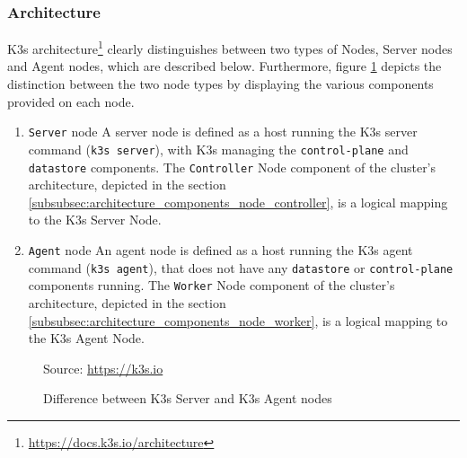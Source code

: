 \subsubsection{Architecture}
\label{subsubsec:implementation_dependencies_k3s_architecture}

K3s architecture\footnote{\url{https://docs.k3s.io/architecture}} clearly distinguishes
between two types of Nodes, Server nodes and Agent nodes, which are described below.
Furthermore, figure \ref{fig:k3s} depicts the distinction between the two node types
by displaying the various components provided on each node.
\begin{enumerate}
  \item \texttt{Server} node
    \newline
    A server node is defined as a host running the K3s server command (\lstinline[language=shell,
    basicstyle=\ttfamily, morekeywords={[2]{k3s}}, morekeywords={[3]{server}}]{k3s server}),
    with K3s managing the \texttt{control-plane} and \texttt{datastore}
    components.
    \newline
    The \texttt{Controller} Node component of the cluster's architecture, depicted
    in the section \ref{subsubsec:architecture_components_node_controller}, is a
    logical mapping to the K3s Server Node.

  \item \texttt{Agent} node
    \newline
    An agent node is defined as a host running the K3s agent command (\lstinline[language=shell,
    basicstyle=\ttfamily, morekeywords={[2]{k3s}}, morekeywords={[3]{agent}}]{k3s agent}),
    that does not have any \texttt{datastore} or \texttt{control-plane}
    components running.
    \newline
    The \texttt{Worker} Node component of the cluster's architecture, depicted in
    the section \ref{subsubsec:architecture_components_node_worker}, is a
    logical mapping to the K3s Agent Node.
\end{enumerate}

\begin{figure}[htbp]
  \centering
  \def\stackalignment{r} %
  {\scriptsize Source: \url{https://k3s.io} }
  \caption{Difference between K3s Server and K3s Agent nodes}
  \label{fig:k3s}
\end{figure}

